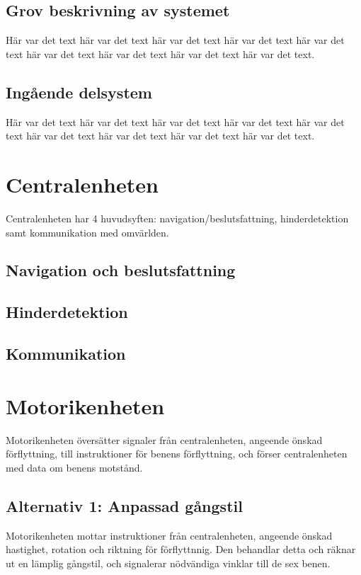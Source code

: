 \documentclass[a4paper,titlepage,12pt]{article}
\begin{document}
	\subsection{Grov beskrivning av systemet}
	Här var det text här var det text här var det text
	här var det text här var det text här var det text
	här var det text här var det text här var det text.
	
	
	\subsection{Ingående delsystem}
	Här var det text här var det text här var det text
	här var det text här var det text här var det text
	här var det text här var det text här var det text.
	
	
	\section{Centralenheten}
	Centralenheten har 4 huvudsyften: navigation/beslutsfattning, hinderdetektion samt
	kommunikation med omvärlden.

	\subsection{Navigation och beslutsfattning}

	\subsection{Hinderdetektion}

	\subsection{Kommunikation}



	
	\section{Motorikenheten}
    Motorikenheten översätter signaler från centralenheten, angeende önskad förflyttning, 
    till instruktioner för benens förflyttning, och förser centralenheten med data om
    benens motstånd.
    
    	\subsection{Alternativ 1: Anpassad gångstil}
    Motorikenheten mottar instruktioner från centralenheten, angeende önskad hastighet, 
    rotation och riktning för förflyttnnig. Den behandlar detta och räknar ut en lämplig 
    gångstil, och signalerar nödvändiga vinklar till de sex benen. 
    
\end{document}
